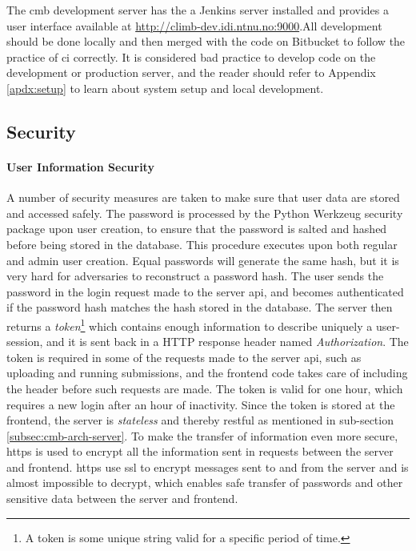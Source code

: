 The \gls{cmb} development server has the a Jenkins server installed and provides a user interface available at \url{http://climb-dev.idi.ntnu.no:9000}.All development should be done locally and then merged with the code on Bitbucket to follow the practice of \gls{ci} correctly. It is considered bad practice to develop code on the development or production server, and the reader should refer to Appendix \ref{apdx:setup} to learn about system setup and local development.

\subsection{Security}

\paragraph*{User Information Security} A number of security measures are taken to make sure that user data are stored and accessed safely. The password is processed by the Python Werkzeug security package \cite{WERKZEUG} upon user creation, to ensure that the password is salted and hashed before being stored in the database. This procedure executes upon both regular and admin user creation. Equal passwords will generate the same hash, but it is very hard for adversaries to reconstruct a password hash. The user sends the password in the login request made to the server \gls{api}, and becomes authenticated if the password hash matches the hash stored in the database. The server then returns a \textit{token}\footnote{A token is some unique string valid for a specific period of time.} which contains enough information to describe uniquely a user-session, and it is sent back in a HTTP response header named \textit{Authorization}. The token is required in some of the requests made to the server \gls{api}, such as uploading and running submissions, and the frontend code takes care of including the header before such requests are made. The token is valid for one hour, which requires a new login after an hour of inactivity. Since the token is stored at the frontend, the server is \textit{stateless} and thereby \gls{rest}ful as mentioned in sub-section \ref{subsec:cmb-arch-server}. To make the transfer of information even more secure, \gls{https} is used to encrypt all the information sent in requests between the server and frontend. \gls{https} use \gls{ssl} to encrypt messages sent to and from the server and is almost impossible to decrypt, which enables safe transfer of passwords and other sensitive data between the server and frontend.

